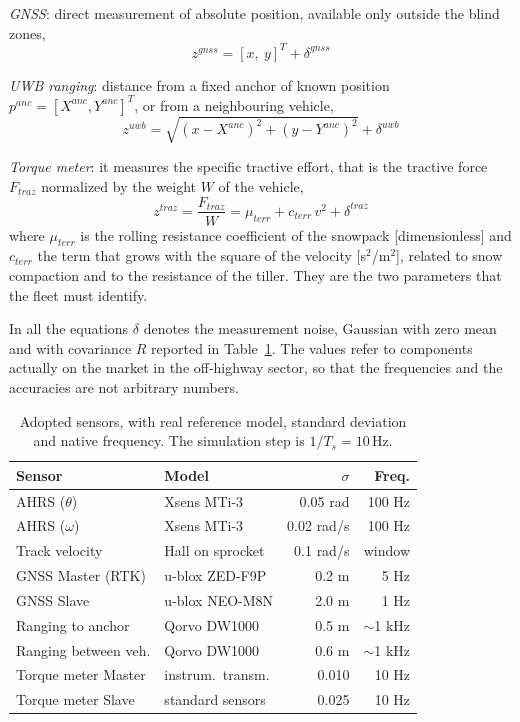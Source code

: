 \documentclass[conference,9pt]{IEEEtran}
\begin{document}
\emph{GNSS}: direct measurement of absolute position, available only outside
the blind zones,
\begin{equation}
z^{gnss} = [x,\ y]^T + \delta^{gnss}
\end{equation}

\emph{UWB ranging}: distance from a fixed anchor of known position
$p^{anc} = [X^{anc}, Y^{anc}]^T$, or from a neighbouring vehicle,
\begin{equation}
z^{uwb} = \sqrt{(x - X^{anc})^2 + (y - Y^{anc})^2} + \delta^{uwb}
\label{eq:uwb}
\end{equation}

\emph{Torque meter}: it measures the specific tractive effort, that is the
tractive force $F_{traz}$ normalized by the weight $W$ of the vehicle,
\begin{equation}
z^{traz} = \frac{F_{traz}}{W} = \mu_{terr} + c_{terr}\,v^2 + \delta^{traz}
\label{eq:traz}
\end{equation}
where $\mu_{terr}$ is the rolling resistance coefficient of the snowpack
[dimensionless] and $c_{terr}$ the term that grows with the square of the
velocity [s$^2$/m$^2$], related to snow compaction and to the resistance of the
tiller. They are the two parameters that the fleet must identify.

In all the equations $\delta$ denotes the measurement noise, Gaussian with zero
mean and with covariance $R$ reported in Table~\ref{tab:sensori}. The values
refer to components actually on the market in the off-highway sector, so that
the frequencies and the accuracies are not arbitrary numbers.

\begin{table}[t]
\centering
\caption{Adopted sensors, with real reference model, standard deviation and
native frequency. The simulation step is $1/T_s = 10$\,Hz.}
\label{tab:sensori}
\begin{tabular}{llrr}
\toprule
\textbf{Sensor} & \textbf{Model} & $\sigma$ & \textbf{Freq.}\\
\midrule
AHRS ($\theta$)      & Xsens MTi-3        & 0.05 rad     & 100 Hz\\
AHRS ($\omega$)      & Xsens MTi-3        & 0.02 rad/s   & 100 Hz\\
Track velocity       & Hall on sprocket   & 0.1 rad/s    & window\\
GNSS Master (RTK)    & u-blox ZED-F9P     & 0.2 m        & 5 Hz\\
GNSS Slave           & u-blox NEO-M8N     & 2.0 m        & 1 Hz\\
Ranging to anchor    & Qorvo DW1000       & 0.5 m        & $\sim$1 kHz\\
Ranging between veh. & Qorvo DW1000       & 0.6 m        & $\sim$1 kHz\\
Torque meter Master  & instrum.\ transm.  & 0.010        & 10 Hz\\
Torque meter Slave   & standard sensors   & 0.025        & 10 Hz\\
\bottomrule
\end{tabular}
\end{table}
\end{document}
